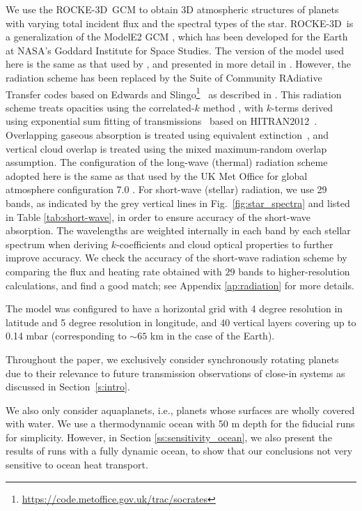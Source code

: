 \documentclass[11pt,numberedappendix,twocolappendix,]{emulateapj}
\def\modelE{ROCKE-3D}
\newcommand{\yf}[1]{{\color{orange}#1}}
\begin{document}
We use the \modelE \ GCM \citep{Way2017} to obtain 3D atmospheric \yf{structures} of planets with varying \yf{total incident flux and the spectral types of the star}. 
\modelE \ is a generalization of the ModelE2 GCM \citep{Schmidt2014}, which has been developed for the Earth at NASA's Goddard Institute for Space Studies. 
%
The version of the model used here is the same as that used by \citet{Way2016}, and presented in more detail in \citet{Way2017}.
However, the radiation scheme has been replaced by the Suite of Community RAdiative Transfer codes based on Edwards and Slingo\footnote{\url{https://code.metoffice.gov.uk/trac/socrates}}~\citep[SOCRATES,][]{EdwardsSlingo1996,Edwards1996} as described in \citet{Way2017}. 
This radiation scheme treats opacities using the correlated-$k$ method \citep{Lacis1991,Goody1989}, with $k$-terms derived using exponential sum fitting of transmissions~\citep{Wiscombe1977} based on HITRAN2012~\citep{Rothman2013}.
Overlapping gaseous absorption is treated using equivalent extinction~\citep{Edwards1996,Amundsen2016}, and vertical cloud overlap is treated using the mixed maximum-random overlap assumption.
The configuration of the long-wave (thermal) radiation scheme adopted here is the same as that used by the UK Met Office for global atmosphere configuration 7.0 \citep[GA7.0;][]{Walters2017}. 
For short-wave (stellar) radiation, we use 29 bands, as indicated by the grey vertical lines in Fig.~\ref{fig:star_spectra} and listed in Table \ref{tab:short-wave}, in order to ensure accuracy of the short-wave absorption. 
The wavelengths are weighted internally in each band by each stellar spectrum when deriving $k$-coefficients and cloud optical properties to further improve accuracy. 
We check the accuracy of the short-wave radiation scheme by comparing the flux and heating rate obtained with $29$ bands to higher-resolution calculations, and find a good match; see Appendix \ref{ap:radiation} for more details. 

The model was configured to have a horizontal grid with 4 degree resolution in latitude and 5 degree resolution in longitude, and 40 vertical layers covering up to 0.14 mbar (corresponding to $\sim 65$ km in the case of the Earth). 

Throughout the paper, we exclusively consider synchronously rotating planets due to their relevance to future transmission observations of close-in systems as discussed in Section~\ref{s:intro}. 

We also only consider aquaplanets, i.e., planets whose surfaces are wholly covered with water. 
We use a thermodynamic ocean with 50 m depth for the fiducial runs for simplicity. 
However, in Section \ref{ss:sensitivity_ocean}, we also present the results of runs with a fully dynamic ocean, to show that our conclusions not very sensitive to ocean heat transport. 
\end{document}
